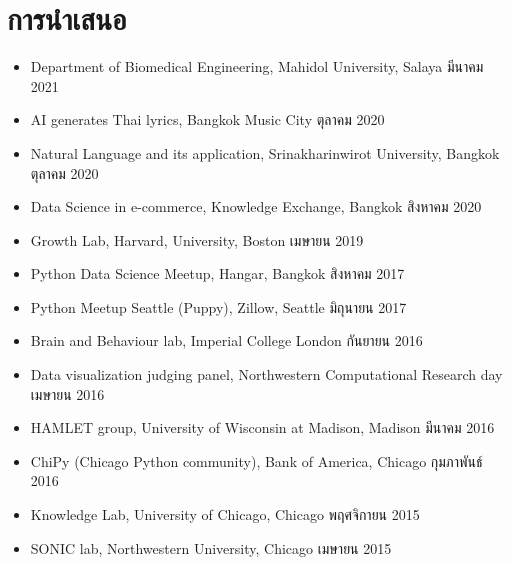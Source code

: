 \section{\sc การนำเสนอ}

\begin{itemize}[leftmargin=0cm, label={}]

\item Department of Biomedical Engineering, Mahidol University, Salaya \hfill มีนาคม 2021
\item AI generates Thai lyrics, Bangkok Music City \hfill ตุลาคม 2020
\item Natural Language and its application, Srinakharinwirot University, Bangkok \hfill ตุลาคม 2020
\item Data Science in e-commerce, Knowledge Exchange, Bangkok \hfill สิงหาคม 2020
\item Growth Lab, Harvard, University, Boston \hfill เมษายน 2019
\item Python Data Science  Meetup, Hangar, Bangkok \hfill สิงหาคม 2017
\item Python Meetup Seattle (Puppy), Zillow, Seattle \hfill มิถุนายน 2017
\item Brain and Behaviour lab, Imperial College London \hfill กันยายน 2016
\item Data visualization judging panel, Northwestern Computational Research day \hfill เมษายน 2016
\item HAMLET group, University of Wisconsin at Madison, Madison \hfill มีนาคม 2016
\item ChiPy (Chicago Python community), Bank of America, Chicago \hfill กุมภาพันธ์ 2016
\item Knowledge Lab, University of Chicago, Chicago \hfill พฤศจิกายน 2015
\item SONIC lab, Northwestern University, Chicago   \hfill เมษายน 2015

\end{itemize}